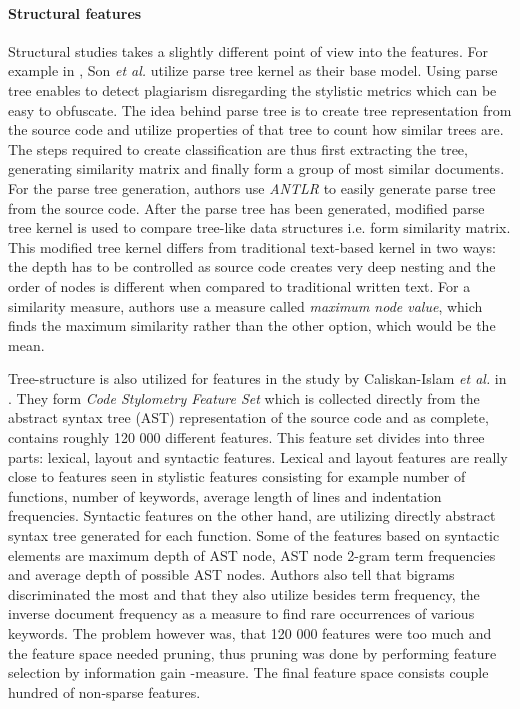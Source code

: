 \documentclass[english]{tktltiki2}
\theoremstyle{definition}
\theoremstyle{remark}
\begin{document}
\paragraph{Structural features}


Structural studies takes a slightly different point of view into the features. For example in \cite{Son:2013:APS:2508269.2508323}, Son \textit{et al.} utilize parse tree kernel as their base model. Using parse tree enables to detect plagiarism disregarding the stylistic metrics which can be easy to obfuscate. The idea behind parse tree is to create tree representation from the source code and utilize properties of that tree to count how similar trees are. The steps required to create classification are thus first extracting the tree, generating similarity matrix and finally form a group of most similar documents. For the parse tree generation, authors use \textit{ANTLR} to easily generate parse tree from the source code. After the parse tree has been generated, modified parse tree kernel is used to compare tree-like data structures i.e. form similarity matrix. This modified tree kernel differs from traditional text-based kernel in two ways: the depth has to be controlled as source code creates very deep nesting and the order of nodes is different when compared to traditional written text. For a similarity measure, authors use a measure called \textit{maximum node value}, which finds the maximum similarity rather than the other option, which would be the mean. 

Tree-structure is also utilized for features in the study by Caliskan-Islam \textit{et al.} in \cite{caliskan2015anonymizing}. They form \textit{Code Stylometry Feature Set} which is collected directly from the abstract syntax tree (AST) representation of the source code and as complete, contains roughly 120 000 different features. This feature set divides into three parts: lexical, layout and syntactic features. Lexical and layout features are really close to features seen in stylistic features consisting for example number of functions, number of keywords, average length of lines and indentation frequencies. Syntactic features on the other hand, are utilizing directly abstract syntax tree generated for each function. Some of the features based on syntactic elements are  maximum depth of AST node, AST node 2-gram term frequencies and average depth of possible AST nodes. Authors also tell that bigrams discriminated the most and that they also utilize besides term frequency, the inverse document frequency as a measure to find rare occurrences of various keywords. The problem however was, that 120 000 features were too much and the feature space needed pruning, thus pruning was done by performing feature selection by information gain -measure. The final feature space consists couple hundred of non-sparse features.
\end{document}
